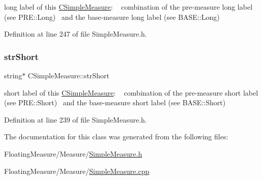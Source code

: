 long label of this \hyperlink{classCSimpleMeasure}{C\+Simple\+Measure}\+: ~\newline
 combination of the pre-\/measure long label (see P\+R\+E\+::\+Long)~\newline
 and the base-\/measure long label (see B\+A\+S\+E\+::\+Long) 



Definition at line 247 of file Simple\+Measure.\+h.

\mbox{\label{classCSimpleMeasure_a39260e6516c163955c34dce6795292ad}} 
\subsubsection{\texorpdfstring{str\+Short}{strShort}}
{\footnotesize\ttfamily string$\ast$ C\+Simple\+Measure\+::str\+Short\hspace{0.3cm}{\ttfamily [protected]}}



short label of this \hyperlink{classCSimpleMeasure}{C\+Simple\+Measure}\+: ~\newline
 combination of the pre-\/measure short label (see P\+R\+E\+::\+Short)~\newline
 and the base-\/measure short label (see B\+A\+S\+E\+::\+Short) 



Definition at line 239 of file Simple\+Measure.\+h.



The documentation for this class was generated from the following files\+:\begin{DoxyCompactItemize}
\item 
Floating\+Measure/\+Measure/\hyperlink{SimpleMeasure_8h}{Simple\+Measure.\+h}\item 
Floating\+Measure/\+Measure/\hyperlink{SimpleMeasure_8cpp}{Simple\+Measure.\+cpp}\end{DoxyCompactItemize}
